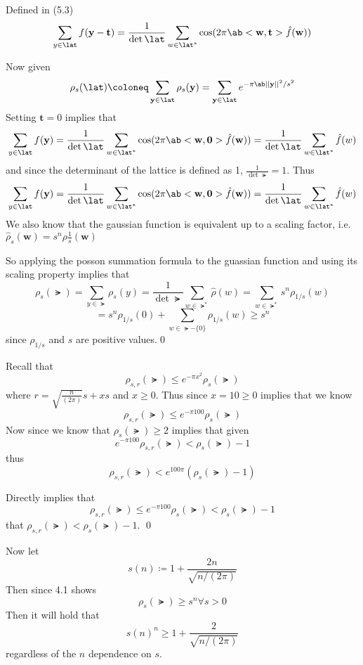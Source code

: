 \documentclass[12pt]{amsart}
\begin{document}
  \begin{problem}
    \begin{subproblem}
    \begin{definition}
      Defined in (5.3) 
      \[\sum_{y\in\lat}f(\mathbf{y}-\mathbf{t}) = \frac1{\det\lat}\sum_{w\in\lat^*}\cos(2\pi\ab<\mathbf{w},\mathbf{t}>\hat f(\mathbf{w}))\]
    \end{definition}
    Now given 
      \[\rho_s(\lat)\coloneq \sum_{\mathbf{y}\in\lat}\rho_s(\mathbf{y}) = \sum_{\mathbf{y}\in \lat} e^{-\pi \ab||\mathbf{y}||^2/s^2}\]
    Setting $\mathbf{t}=0$ implies that 
    \[\sum_{y\in\lat}f(\mathbf{y}) = \frac1{\det\lat}\sum_{w\in\lat^*}\cos(2\pi\ab<\mathbf{w},\mathbf{0}>\hat f(\mathbf{w}))= \frac1{\det\lat}\sum_{w\in\lat^*}\hat f(w)\]
    and since the determinant of the lattice is defined as 1, $\frac1{\det{\lat}}=1$. Thus 
    \[\sum_{y\in\lat}f(\mathbf{y}) = \frac1{\det\lat}\sum_{w\in\lat^*}\cos(2\pi\ab<\mathbf{w},\mathbf{0}>\hat f(\mathbf{w}))= \frac1{\det\lat}\sum_{w\in\lat^*}\hat f(w)\]
    We also know that the gaussian function is equivalent up to a scaling factor, i.e. $\hat \rho_s(\mathbf{w})=s^n\rho{\frac1s}(\mathbf{w})$

  So applying the posson summation formula to the guassian function and using its scaling property implies that 
  \[\rho_s(\lat)=\sum_{y\in\lat}\rho_s(y) = \frac1{\det{\lat}}\sum_{w\in\lat^*} \hat \rho(w) = \sum_{w\in\lat^*}s^n \rho_{1/s}(w)\]
  \[=s^n\rho_{1/s}(0)+\sum_{w\in\lat-\{0\}}\rho_{1/s}(w) \geq s^n\]
  since $\rho_{1/s}$ and $s$ are positive values.\qed
  \end{subproblem}
  \begin{subproblem}
    Recall that 
    \[\rho_{s,r}(\lat)\leq e^{-\pi x^2}\rho_s(\lat)\]
    where $r=\sqrt{\frac n{(2\pi)}}s+xs$ and $x\geq 0$.
    Thus since $x=10\geq0$ implies that we know 
    \[\rho_{s,r}(\lat)\leq e^{-\pi 100}\rho_s(\lat)\]
    Now since we know that $\rho_s(\lat)\geq 2$ implies that given 
    \[e^{-\pi100}\rho_{s,r}(\lat)<\rho_s(\lat)-1\]
    thus
    \[\rho_{s,r}(\lat)< e^{100\pi}(\rho_s(\lat)-1)\]



    Directly implies that 
    \[\rho_{s,r}(\lat)\leq e^{-\pi100}\rho_s(\lat)< \rho_s(\lat)-1\] 
    that $\rho_{s,r}(\lat) < \rho_s(\lat)-1$. \qed
  \end{subproblem}
  \begin{subproblem}
    Now let 
    \[s(n) \coloneq 1+\frac {2n}{\sqrt{n/(2\pi)}}\]
    Then since 4.1 shows 
    \[\rho_s(\lat) \geq s^n \forall s>0\]
    Then it will hold that 
    \[s(n)^n \geq 1+\frac 2{\sqrt{n/(2\pi)}}\]
    regardless of the $n$ dependence on $s$.


\end{subproblem}
\end{problem}
\end{document}
